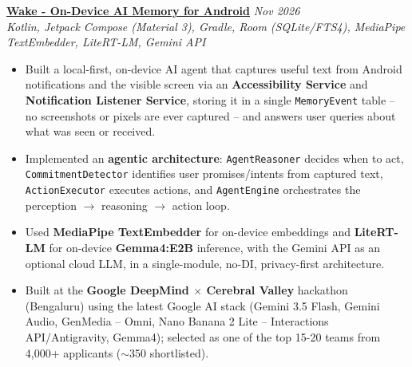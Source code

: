 \documentclass[a4paper]{article}
\begin{document}
\href{https://cerebralvalley.ai/e/google-deepmind-bangalore-hackathon/hackathon/gallery?project=81}{\textbf{Wake - On-Device AI Memory for Android}} \hfill \textit{Nov 2026}\\
{\sl Kotlin, Jetpack Compose (Material 3), Gradle, Room (SQLite/FTS4), MediaPipe TextEmbedder, LiteRT-LM, Gemini API}
\begin{itemize} \itemsep 1pt
    \item Built a local-first, on-device AI agent that captures useful text from Android notifications and the visible screen via an \textbf{Accessibility Service} and \textbf{Notification Listener Service}, storing it in a single \texttt{MemoryEvent} table -- no screenshots or pixels are ever captured -- and answers user queries about what was seen or received.
    \item Implemented an \textbf{agentic architecture}: \texttt{AgentReasoner} decides when to act, \texttt{CommitmentDetector} identifies user promises/intents from captured text, \texttt{ActionExecutor} executes actions, and \texttt{AgentEngine} orchestrates the perception $\to$ reasoning $\to$ action loop.
    \item Used \textbf{MediaPipe TextEmbedder} for on-device embeddings and \textbf{LiteRT-LM} for on-device \textbf{Gemma4:E2B} inference, with the Gemini API as an optional cloud LLM, in a single-module, no-DI, privacy-first architecture.
    \item Built at the \textbf{Google DeepMind $\times$ Cerebral Valley} hackathon (Bengaluru) using the latest Google AI stack (Gemini 3.5 Flash, Gemini Audio, GenMedia -- Omni, Nano Banana 2 Lite -- Interactions API/Antigravity, Gemma4); selected as one of the top 15-20 teams from 4,000+ applicants ($\sim$350 shortlisted).
\end{itemize}
\vspace*{2mm}
\end{document}

